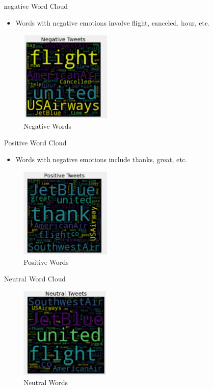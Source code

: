 \documentclass[
 size=14pt,
 paper=smartboard,  %
 mode=present, 		%
 display=slides, 	%
 style=tuliplab,  	%
 pauseslide,
 fleqn,leqno]{powerdot}
\begin{document}
\begin{slide}{negative Word Cloud}
  \begin{itemize}
    \item Words with negative emotions involve flight, canceled, hour, etc.
  \end{itemize}
  \begin{figure}[htbp]
    \centering
    \includegraphics[width=0.4\textwidth]{figures//negativetweet.eps}
    \caption{Negative Words}
  \end{figure}
\end{slide}

\begin{slide}{Positive Word Cloud}
  \begin{itemize}
    \item Words with negative emotions include thanks, great, etc.
  \end{itemize}
  \begin{figure}[htbp]
    \centering
    \includegraphics[width=0.4\textwidth]{figures//positiontweet.eps}
    \caption{Positive Words}
  \end{figure}
\end{slide}

\begin{slide}{Neutral Word Cloud}

  \begin{figure}[htbp]
    \centering
    \includegraphics[width=0.4\textwidth]{figures//neutraltweet.eps}
    \caption{Neutral Words}
  \end{figure}
\end{slide}
\end{document}
